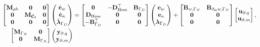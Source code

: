 \begin{equation}\label{eq:pHsys_findim_bdKir_open}
\begin{aligned}
\begin{bmatrix}
\mathbf{M}_{\rho h} & \mathbf{0} & \mathbf{0}\\
\mathbf{0} & \mathbf{M}_{\bm{\mathcal{C}}_b} & \mathbf{0}\\
\mathbf{0} & \mathbf{0} & \mathbf{0}\\
\end{bmatrix}
\begin{pmatrix}
\dot{\mathbf{e}}_{w} \\
\dot{\mathbf{e}}_{\kappa} \\
\dot{\bm{\lambda}}_{\Gamma_D} \\
\end{pmatrix}
&= \begin{bmatrix}
\mathbf{0} & - \mathbf{D}_{\operatorname*{Hess}}^\top & \mathbf{B}_{\Gamma_D}\\
\mathbf{D}_{\operatorname*{Hess}} & \mathbf{0} & \mathbf{0} \\
-\mathbf{B}_{\Gamma_D}^\top & \mathbf{0} & \mathbf{0} \\
\end{bmatrix} 
\begin{pmatrix}
{\mathbf{e}}_{w} \\
{\mathbf{e}}_{\kappa} \\
{\bm{\lambda}}_{\Gamma_D} \\
\end{pmatrix} + 
\begin{bmatrix}
\mathbf{B}_{w, \Gamma_N} & \mathbf{B}_{\partial_{\bm{n}} w, \Gamma_N}\\
\mathbf{0} & \mathbf{0} \\
\mathbf{0} & \mathbf{0} \\
\end{bmatrix}
\begin{bmatrix}
\mathbf{u}_{\partial, q} \\
\mathbf{u}_{\partial, m} \\
\end{bmatrix}, \\
\begin{bmatrix}
\mathbf{M}_{\Gamma_N} & \mathbf{0} \\
\mathbf{0} & \mathbf{M}_{\Gamma_N} \\
\end{bmatrix}
\begin{pmatrix}
\mathbf{y}_{\partial, q} \\
\mathbf{y}_{\partial, m} \\

\end{pmatrix}
\end{aligned}
\end{equation}
